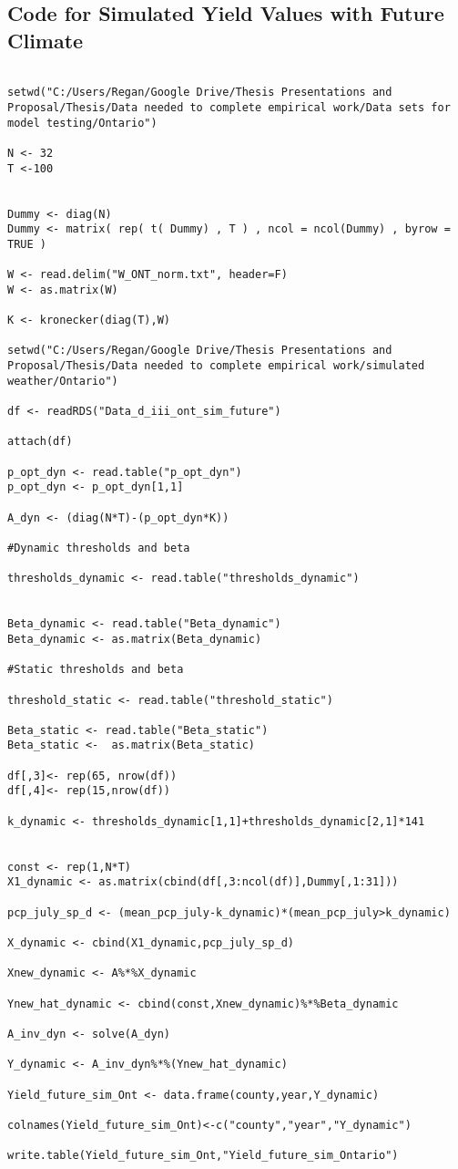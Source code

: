 \subsection{Code for Simulated Yield Values with Future Climate}

\begin{lstlisting}

setwd("C:/Users/Regan/Google Drive/Thesis Presentations and Proposal/Thesis/Data needed to complete empirical work/Data sets for model testing/Ontario")

N <- 32
T <-100


Dummy <- diag(N)
Dummy <- matrix( rep( t( Dummy) , T ) , ncol = ncol(Dummy) , byrow = TRUE )

W <- read.delim("W_ONT_norm.txt", header=F)
W <- as.matrix(W)

K <- kronecker(diag(T),W)

setwd("C:/Users/Regan/Google Drive/Thesis Presentations and Proposal/Thesis/Data needed to complete empirical work/simulated weather/Ontario")

df <- readRDS("Data_d_iii_ont_sim_future")

attach(df)

p_opt_dyn <- read.table("p_opt_dyn")
p_opt_dyn <- p_opt_dyn[1,1]

A_dyn <- (diag(N*T)-(p_opt_dyn*K))

#Dynamic thresholds and beta

thresholds_dynamic <- read.table("thresholds_dynamic")


Beta_dynamic <- read.table("Beta_dynamic")
Beta_dynamic <- as.matrix(Beta_dynamic)

#Static thresholds and beta

threshold_static <- read.table("threshold_static")

Beta_static <- read.table("Beta_static")
Beta_static <-  as.matrix(Beta_static)

df[,3]<- rep(65, nrow(df))
df[,4]<- rep(15,nrow(df))

k_dynamic <- thresholds_dynamic[1,1]+thresholds_dynamic[2,1]*141


const <- rep(1,N*T)
X1_dynamic <- as.matrix(cbind(df[,3:ncol(df)],Dummy[,1:31]))

pcp_july_sp_d <- (mean_pcp_july-k_dynamic)*(mean_pcp_july>k_dynamic)

X_dynamic <- cbind(X1_dynamic,pcp_july_sp_d)

Xnew_dynamic <- A%*%X_dynamic

Ynew_hat_dynamic <- cbind(const,Xnew_dynamic)%*%Beta_dynamic

A_inv_dyn <- solve(A_dyn)

Y_dynamic <- A_inv_dyn%*%(Ynew_hat_dynamic)

Yield_future_sim_Ont <- data.frame(county,year,Y_dynamic)

colnames(Yield_future_sim_Ont)<-c("county","year","Y_dynamic")

write.table(Yield_future_sim_Ont,"Yield_future_sim_Ontario")

\end{lstlisting}



